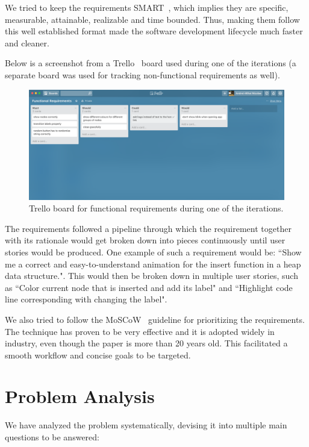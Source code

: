 \documentclass{l4proj}
\begin{document}
We tried to keep the requirements SMART~\cite{smart-requirements}, which implies they are specific, measurable, attainable, realizable and time bounded. Thus, making them follow this well established format made the software development lifecycle much faster and cleaner.

Below is a screenshot from a Trello~\cite{trello} board used during one of the iterations (a separate board was used for tracking non-functional requirements as well).

\begin{figure}[!ht]
\centering
\includegraphics[scale=0.35]{trello-functional-requirements}
\caption{Trello board for functional requirements during one of the iterations.}
\label{fig:trello-functional-requirements}
\end{figure}

The requirements followed a pipeline through which the requirement together with its rationale would get broken down
into pieces continuously until user stories would be produced. One example of such a requirement would be: ``Show me a
correct and easy-to-understand animation for the insert function in a heap data structure.". This would then be broken
down in multiple user stories, such as ``Color current node that is inserted and add its label" and ``Highlight code line corresponding with changing the label".

We also tried to follow the MoSCoW~\cite{moscow-requirements} guideline for prioritizing the requirements. The technique has proven to be very effective and it is adopted widely in industry, even though the paper is more than 20 years old. This facilitated a smooth workflow and concise goals to be targeted.

\section{Problem Analysis}

We have analyzed the problem systematically, devising it into multiple main questions to be answered:
\end{document}
